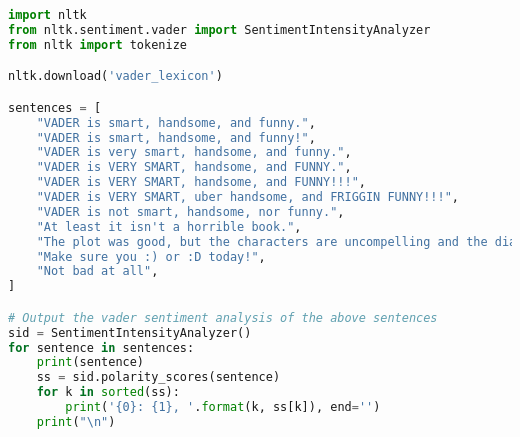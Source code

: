 \documentclass[12pt]{article}
\begin{document}
\begin{lstlisting}[language=python, basicstyle=\small]
import nltk
from nltk.sentiment.vader import SentimentIntensityAnalyzer
from nltk import tokenize

nltk.download('vader_lexicon')

sentences = [
    "VADER is smart, handsome, and funny.",
    "VADER is smart, handsome, and funny!",
    "VADER is very smart, handsome, and funny.",
    "VADER is VERY SMART, handsome, and FUNNY.",
    "VADER is VERY SMART, handsome, and FUNNY!!!",
    "VADER is VERY SMART, uber handsome, and FRIGGIN FUNNY!!!",
    "VADER is not smart, handsome, nor funny.",
    "At least it isn't a horrible book.",
    "The plot was good, but the characters are uncompelling and the dialog is not great.",
    "Make sure you :) or :D today!",
    "Not bad at all",
]

# Output the vader sentiment analysis of the above sentences
sid = SentimentIntensityAnalyzer()
for sentence in sentences:
    print(sentence)
    ss = sid.polarity_scores(sentence)
    for k in sorted(ss):
        print('{0}: {1}, '.format(k, ss[k]), end='')
    print("\n")
\end{lstlisting}
\end{document}
